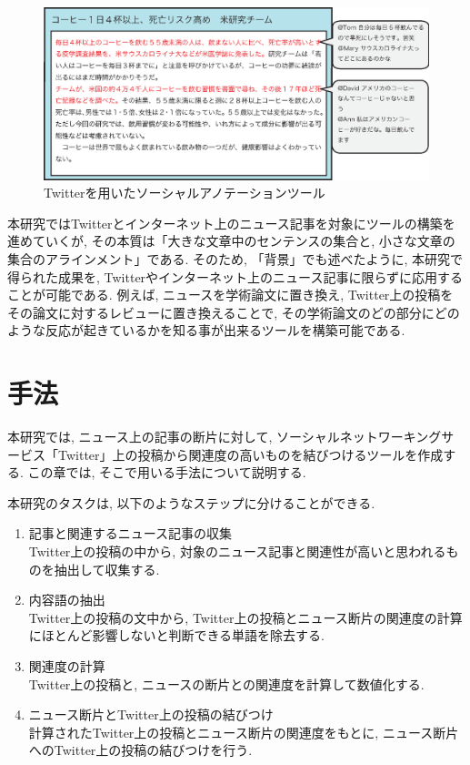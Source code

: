 \documentclass[12pt]{jarticle}
\begin{document}
\begin{figure}[htbp]
  \begin{center}
    \includegraphics{ai/social_annotation.eps}
  \end{center}
  \caption{Twitterを用いたソーシャルアノテーションツール}
  \label{fig1}
\end{figure}

本研究ではTwitterとインターネット上のニュース記事を対象にツールの構築を進めていくが, その本質は「大きな文章中のセンテンスの集合と, 小さな文章の集合のアラインメント」である. そのため, 「背景」でも述べたように, 本研究で得られた成果を, Twitterやインターネット上のニュース記事に限らずに応用することが可能である. 例えば, ニュースを学術論文に置き換え, Twitter上の投稿をその論文に対するレビューに置き換えることで, その学術論文のどの部分にどのような反応が起きているかを知る事が出来るツールを構築可能である.

\newpage

\section{手法}
本研究では, ニュース上の記事の断片に対して, ソーシャルネットワーキングサービス「Twitter」上の投稿から関連度の高いものを結びつけるツールを作成する. この章では, そこで用いる手法について説明する.

本研究のタスクは, 以下のようなステップに分けることができる.

\begin{enumerate}
  \item 記事と関連するニュース記事の収集\\
    Twitter上の投稿の中から, 対象のニュース記事と関連性が高いと思われるものを抽出して収集する.
  \item 内容語の抽出\\
    Twitter上の投稿の文中から, Twitter上の投稿とニュース断片の関連度の計算にほとんど影響しないと判断できる単語を除去する.
  \item 関連度の計算\\
    Twitter上の投稿と, ニュースの断片との関連度を計算して数値化する.
  \item ニュース断片とTwitter上の投稿の結びつけ\\
    計算されたTwitter上の投稿とニュース断片の関連度をもとに, ニュース断片へのTwitter上の投稿の結びつけを行う.
\end{enumerate}
\end{document}
